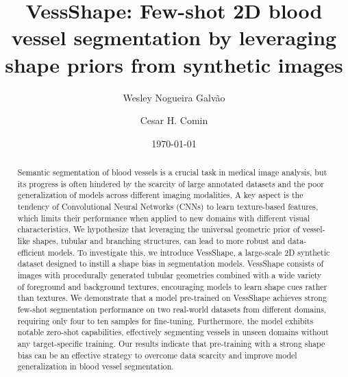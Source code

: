 \documentclass[%
reprint,
nofootinbib,
 amsmath,amssymb,
aps,
superscriptaddress,
showkeys,
longbibliography
]{revtex4-1}
\begin{document}
%



\title{VessShape: Few-shot 2D blood vessel segmentation by leveraging shape priors from synthetic images}

\author{Wesley Nogueira Galvão}


\author{Cesar H. Comin}

\date{\today}%

\begin{abstract}

Semantic segmentation of blood vessels is a crucial task in medical image analysis, but its progress is often hindered by the scarcity of large annotated datasets and the poor generalization of models across different imaging modalities. A key aspect is the tendency of Convolutional Neural Networks (CNNs) to learn texture-based features, which limits their performance when applied to new domains with different visual characteristics. We hypothesize that leveraging the universal geometric prior of vessel-like shapes, tubular and branching structures, can lead to more robust and data-efficient models. To investigate this, we introduce VessShape, a large-scale 2D synthetic dataset designed to instill a shape bias in segmentation models. VessShape consists of images with procedurally generated tubular geometries combined with a wide variety of foreground and background textures, encouraging models to learn shape cues rather than textures. We demonstrate that a model pre-trained on VessShape achieves strong few-shot segmentation performance on two real-world datasets from different domains, requiring only four to ten samples for fine-tuning. Furthermore, the model exhibits notable zero-shot capabilities, effectively segmenting vessels in unseen domains without any target-specific training. Our results indicate that pre-training with a strong shape bias can be an effective strategy to overcome data scarcity and improve model generalization in blood vessel segmentation.

\end{abstract}
\end{document}
